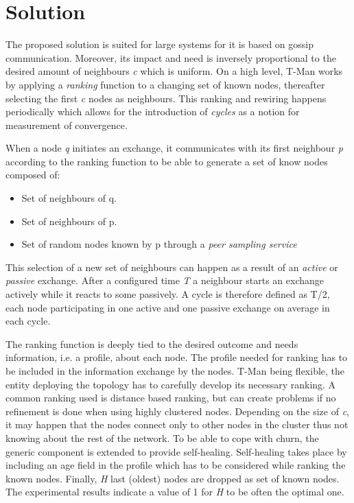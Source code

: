 \documentclass[conference]{IEEEtran}
\begin{document}
\section{Solution}
The proposed solution is suited for large systems for it is based on gossip communication.
Moreover, its impact and need is inversely proportional to the desired amount of neighbours \emph{c} which is uniform.
On a high level, T-Man works by applying a \emph{ranking} function to a changing set of known nodes, thereafter selecting the first \emph{c} nodes as neighbours. This ranking and rewiring  happens periodically which allows for the introduction of \emph{cycles} as a notion for measurement of convergence.

When a node \emph{q} initiates an exchange, it communicates with its first neighbour \emph{p} according to the ranking function to be able to generate a set of know nodes composed of:
\begin{itemize}
    \item Set of neighbours of q.
    \item Set of neighbours of p.
    \item Set of random nodes known by p through a \emph{peer sampling service}\cite{10.1007/978-3-540-30229-2_5}
\end{itemize}
This selection of a new set of neighbours can happen as a result of an \emph{active} or \emph{passive} exchange.
After a configured time \emph{T} a neighbour starts an exchange actively while it reacts to some passively.
A cycle is therefore defined as T/2, each node participating in one active and one passive exchange on average in each cycle.

The ranking function is deeply tied to the desired outcome and needs information, i.e. a profile, about each node.
The profile needed for ranking has to be included in the information exchange by the nodes.
T-Man being flexible, the entity deploying the topology has to carefully develop its necessary ranking.
A common ranking used is distance based ranking, but can create problems if no refinement is done when using highly clustered nodes.
Depending on the size of \emph{c}, it may happen that the nodes connect only to other nodes in the cluster thus not knowing about the rest of the network.
To be able to cope with churn, the generic component is extended to provide self-healing.
Self-healing takes place by including an age field in the profile which has to be considered while ranking the known nodes.
Finally, \emph{H} last (oldest) nodes are dropped as set of known nodes.
The experimental results indicate a value of 1 for \emph{H} to be often the optimal one.
\end{document}
